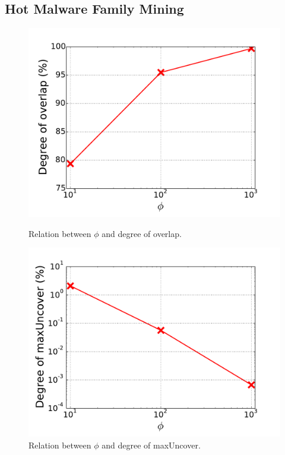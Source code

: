 \subsection{Hot Malware Family Mining}
\label{sec:hot}

\begin{figure}[!htb]
  \includegraphics[width=\linewidth]{figure/overlap.pdf}
  \caption{Relation between $\phi$ and degree of overlap.}
  \label{fig:overlap}
\endminipage\hfill
{}
  \includegraphics[width=\linewidth]{figure/maxUncover.pdf}
  \caption{Relation between $\phi$ and degree of maxUncover.}
  \label{fig:maxUncover}
\endminipage\hfill
{}%

\end{figure}
